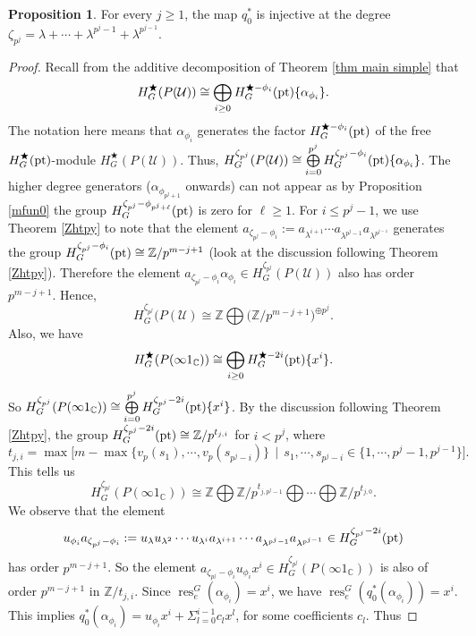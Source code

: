 \documentclass[a4paper,leqno,11pt]{amsart}
\theoremstyle{plain}
\theoremstyle{definition}
\newtheorem{prop}[theorem]{Proposition}
\theoremstyle{remark}
\theoremstyle{definition}
\newcommand{\C}{{\mathbb C}}
\newcommand{\Z}{{\mathbb{Z}}}
\newcommand{\res}{\mathit{res}}
\def\Z{\mathbb{Z}}
\def\a{\alpha}
\def\lam{\lambda}
\def\C{\mathbb{C}}
\numberwithin{equation}{section}
\newcommand{\pt}{\textup{pt}}
\renewcommand{\res}{\operatorname{res}}
\begin{document}
	\begin{prop}\label{prop:q0 injective}
	For every $j\geq 1$, the map $ q_0^* $ is injective at the degree $\zeta_{p^j}=\lambda+\cdots+\lambda^{p^j-1}+\lambda^{p^{j-1}}$.
	\end{prop}
	\begin{proof}
		Recall from  the additive decomposition of Theorem \ref{thm main simple} that 
		$$H^{\bigstar}_{G}(P(\mathcal{U}))\cong \bigoplus\limits_{i\geq0}H^{\bigstar -\phi_{i}}_{G}(\pt)\{\alpha_{\phi_i}\}.$$
		The notation here means that  $ \alpha_{\phi_i}$ generates  the factor  $ H^{\bigstar -\phi_{i}}_{G}(\pt) $ of the free $ H^{\bigstar}_{G}(\pt) $-module $ H^{\bigstar}_{G}(P(\mathcal{U})) $. Thus, $H^{\zeta_{p^j}}_{G}(P(\mathcal{U})) \cong \bigoplus\limits_{i= 0}^{p^j} H^{\zeta_{p^j}-\phi_{i}}_{G}(\pt)\{\alpha_{\phi_i}\}$. The higher degree generators ($ \alpha_{\phi_{p^j+1}} $ onwards) can not appear as by Proposition \ref{mfun0} the group $ H^{\zeta_{p^j}-\phi_{p^j+\ell}}_{G}(\pt) $ is zero for $ \ell\ge 1 $. For $i\leq p^j -1 $, we use Theorem \ref{Zhtpy} to note that the element $ a_{\zeta_{p^j}-\phi_i}:= a_{\lam^{i+1}}\cdots a_{\lam^{p^j-1}}a_{\lambda^{p^{j-1}}}$ generates the group  $ H^{\zeta_{p^j}-\phi_{i}}_{G}(\pt)\cong  \Z/p^{m-j+1}$ (look at the discussion following Theorem \ref{Zhtpy}).
		Therefore the element   $a_{\zeta_{p^j}-\phi_{i}}\a_{\phi_{i}}\in H^{\zeta_{p^j}}_{G}(P(\mathcal{U}))$
		also  has order $p^{m-j+1}$.
		Hence, 
		\[H^{\zeta_{p^j}}_{G}(P(\mathcal{U})\cong \Z\bigoplus \Big(\Z/p^{m-j+1}\Big)^{\oplus p^j}.\]
		 Also, we have 
		$$
		H^{\bigstar}_{G}(P(\infty 1_{\C}))\cong \bigoplus\limits_{i\geq0}H^{\bigstar - 2i}_{G}(\pt)\{x^{i}\}.
		$$
		So $H^{\zeta_{p^j}}_{G}(P(\infty1_{\C})) \cong \bigoplus\limits_{i= 0}^{p^j} H^{\zeta_{p^j}-2i}_{G}(\pt)\{x^{i}\}$. By the discussion following Theorem \ref{Zhtpy}, the group  $H^{\zeta_{p^j}-2i}_{G}(\pt) \cong  \Z/p^{t_{j,i}}$ for $i<p^j$, where  
		\[
		t_{j,i}=\max\big[m- \max\{v_p(s_1),\cdots, v_p(s_{p^j-i})\}  ~~|~~ s_1,\cdots, s_{p^{j}-i}\in \{1,\cdots, p^j-1,p^{j-1}\}\big].
		\]
		This tells us 
		\[ H^{\zeta_{p^j}}_{G}(P(\infty 1_{\C}))\cong \Z\bigoplus\Z/p^{t_{j,p^j-1}}\bigoplus\cdots\bigoplus\Z/p^{t_{j,0}} .\]
		We observe that the element 
		$$
		u_{\phi_{i}}a_{\zeta_{p^j}-\phi_{i}} := u_{\lam}u_{\lam^2}\cdots u_{\lam^i}a_{\lam^{i+1}}\cdots a_{\lam^{p^j-1}}a_{\lambda^{p^{j-1}}} \in H^{\zeta_{p^j}-2i}_{G}(\pt) 
		$$
		has order $p^{m-j+1}$.
		So the element $a_{\zeta_{p^j}-\phi_{i}}u_{\phi_{i}}x^{i}\in H^{\zeta_{p^j}}_{G}(P(\infty 1_{\C}))$ is also of order 
		$p^{m-j+1}$ in $\Z/t_{j,i}$. Since $ \res^G_e(\alpha_{\phi_i}) =x^{i}$, we have $\res^G_e(q_{0}^{*}(\a_{\phi_{i}}))=x^{i}$. This  implies  $q_{0}^{*}(\alpha_{\phi_{i}})= u_{\phi_{i}}x^{i} + \Sigma _{l=0}^{i-1}c_lx^{l}$, for some coefficients $ c_l $. Thus 

\end{proof}
\end{document}
